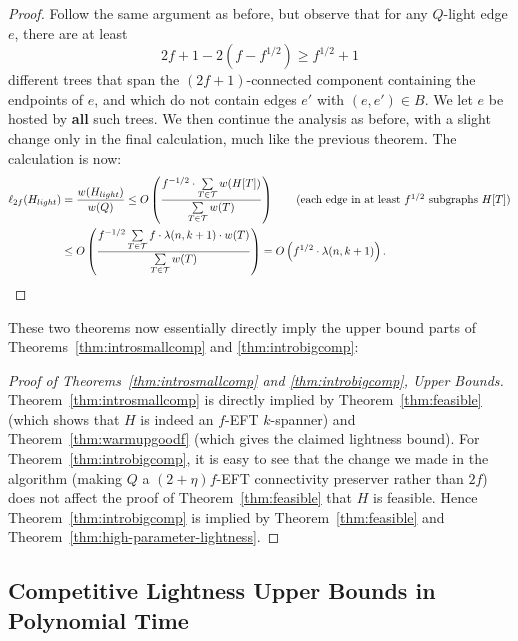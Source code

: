 \documentclass{article}
\newif\ifshort
\theoremstyle{plain}
\theoremstyle{definition}
\newcommand{\tee}{\mathcal{T}}
\begin{document}
\begin{proof}
Follow the same argument as before, but observe that for any $Q$-light edge $e$, there are at least 
$$2f+1 - 2(f - f^{1/2}) \ge f^{1/2} +1$$ 
different trees that span the $(2f+1)$-connected component containing the endpoints of $e$, and which do not contain edges $e'$ with $(e, e') \in B$.
We let $e$ be hosted by \textbf{all} such trees.
We then continue the analysis as before, with a slight change only in the final calculation, much like the previous theorem.
The calculation is now:
\begin{align*}
\ell_{2f}(H_{light}) &= \frac{w(H_{light})}{w(Q)} \le  O\left(  \frac{f^{-1/2} \cdot \sum \limits_{T \in \tee} w(H[T])}{\sum \limits_{T \in \tee} w(T)} \right) \tag{each edge in at least $f^{1/2}$ subgraphs $H[T]$}\\
&\le  O\left( \frac{f^{-1/2} \sum \limits_{T \in \tee} f \cdot \lambda(n, k+1) \cdot w(T)}{\sum \limits_{T \in \tee} w(T)} \right) = O\left(f^{1/2} \cdot \lambda(n, k+1)\right). \tag*{\qedhere}
\end{align*}
\end{proof}

These two theorems now essentially directly imply the upper bound parts of Theorems~\ref{thm:introsmallcomp} and \ref{thm:introbigcomp}:

\begin{proof}[Proof of Theorems~\ref{thm:introsmallcomp} and \ref{thm:introbigcomp}, Upper Bounds]
    Theorem~\ref{thm:introsmallcomp} is directly implied by Theorem~\ref{thm:feasible} (which shows that $H$ is indeed an $f$-EFT $k$-spanner) and Theorem~\ref{thm:warmupgoodf} (which gives the claimed lightness bound).  For Theorem~\ref{thm:introbigcomp}, it is easy to see that the change we made in the algorithm (making $Q$ a $(2+\eta)f$-EFT connectivity preserver rather than $2f$) does not affect the proof of Theorem~\ref{thm:feasible} that $H$ is feasible.  Hence Theorem~\ref{thm:introbigcomp} is implied by Theorem~\ref{thm:feasible} and Theorem~\ref{thm:high-parameter-lightness}.
\end{proof}

\ifshort
\else
\subsection{Competitive Lightness Upper Bounds in Polynomial Time} \label{sec:polytime}
\end{document}
